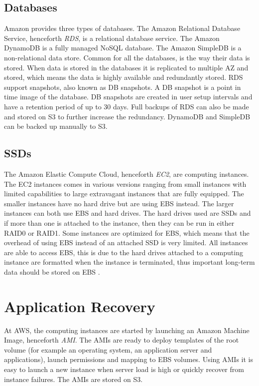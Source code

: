 \documentclass[11pt]{report}
\begin{document}
\subsection{Databases}
Amazon provides three types of databases. The Amazon Relational Database Service, henceforth \emph{RDS}, is a relational database service. The Amazon DynamoDB is a fully managed NoSQL database. The Amazon SimpleDB is a non-relational data store. Common for all the databases, is the way their data is stored. When data is stored in the databases it is replicated to multiple AZ and stored, which means the data is highly available and redundantly stored. RDS support snapshots, also known as DB snapshots. A DB snapshot is a point in time image of the database. DB snapshots are created in user setup intervals and have a retention period of up to 30 days. Full backups of RDS can also be made and stored on S3 to further increase the redundancy. DynamoDB and SimpleDB can be backed up manually to S3.

\subsection{SSDs}
The Amazon Elastic Compute Cloud, henceforth \emph{EC2}, are computing instances. The EC2 instances comes in various versions ranging from small instances with limited capabilities to large extravagant instances that are fully equipped. The smaller instances have no hard drive but are using EBS instead. The larger instances can both use EBS and hard drives. The hard drives used are SSDs and if more than one is attached to the instance, then they can be run in either RAID0 or RAID1. Some instances are optimized for EBS, which means that the overhead of using EBS instead of an attached SSD is very limited. All instances are able to access EBS, this is due to the hard drives attached to a computing instance are formatted when the instance is terminated, thus important long-term data should be stored on EBS \cite{AWS_instance_storage}. 

\section{Application Recovery}
At AWS, the computing instances are started by launching an Amazon Machine Image, henceforth \emph{AMI}. The AMIs are ready to deploy templates of the root volume (for example an operating system, an application server and applications), launch permissions and mapping to EBS volumes. Using AMIs it is easy to launch a new instance when server load is high or quickly recover from instance failures. The AMIs are stored on S3.
\end{document}
